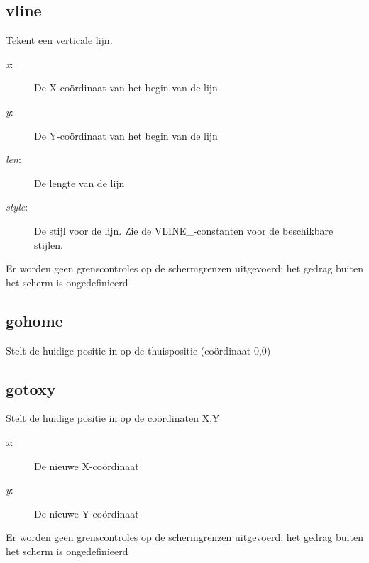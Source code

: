 \subsection{vline}
\begin{description}[leftmargin=2.4cm,style=nextline]
\item [Beschrijving:] {Tekent een verticale lijn.}\item [Syntaxis:] \item [Parameters:]
\begin{description}
\item [{\em x}:] {De X-coördinaat van het begin van de lijn}\item [{\em y}:] {De Y-coördinaat van het begin van de lijn}\item [{\em len}:] {De lengte van de lijn}\item [{\em style}:] {De stijl voor de lijn. Zie de VLINE\_-constanten voor de beschikbare stijlen.}
\end{description}
\item [Opmerkingen:] {Er worden geen grenscontroles op de schermgrenzen uitgevoerd; het gedrag buiten het scherm is ongedefinieerd}
\end{description}

\subsection{gohome}
\begin{description}[leftmargin=2.4cm,style=nextline]
\item [Beschrijving:] {Stelt de huidige positie in op de thuispositie (coördinaat 0,0)}\item [Syntaxis:] 
\end{description}

\subsection{gotoxy}
\begin{description}[leftmargin=2.4cm,style=nextline]
\item [Beschrijving:] {Stelt de huidige positie in op de coördinaten X,Y}\item [Syntaxis:] \item [Parameters:]
\begin{description}
\item [{\em x}:] {De nieuwe X-coördinaat}\item [{\em y}:] {De nieuwe Y-coördinaat}
\end{description}
\item [Opmerkingen:] {Er worden geen grenscontroles op de schermgrenzen uitgevoerd; het gedrag buiten het scherm is ongedefinieerd}
\end{description}

